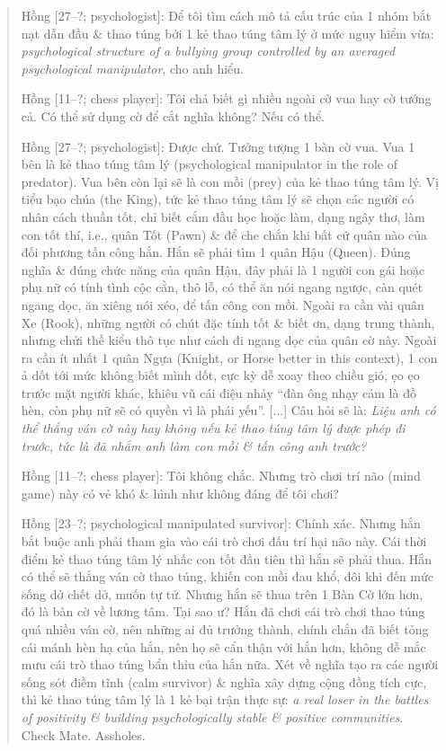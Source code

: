 \documentclass[12pt]{article}
\begin{document}
\begin{quote}
	{\sf Hồng [27--?; psychologist]}: Để tôi tìm cách mô tả cấu trúc của 1 nhóm bắt nạt dẫn đầu \& thao túng bởi 1 kẻ thao túng tâm lý ở mức nguy hiểm vừa: {\it psychological structure of a bullying group controlled by an averaged psychological manipulator}, cho anh hiểu.
	
	{\sf Hồng [11--?; chess player]}: Tôi chả biết gì nhiều ngoài cờ vua hay cờ tướng cả. Có thể sử dụng cờ để cắt nghĩa không? Nếu có thể.
	
	{\sf Hồng [27--?; psychologist]}: Được chứ. Tưởng tượng 1 bàn cờ vua. Vua 1 bên là kẻ thao túng tâm lý (psychological manipulator in the role of predator). Vua bên còn lại sẽ là con mồi (prey) của kẻ thao túng tâm lý. Vị tiểu bạo chúa (the King), tức kẻ thao túng tâm lý sẽ chọn các người có nhân cách thuần tốt, chỉ biết cắm đầu học hoặc làm, dạng ngây thơ, làm con tốt thí, i.e., quân Tốt (Pawn) \& để che chắn khi bất cứ quân nào của đối phương tấn công hắn. Hắn sẽ phải tìm 1 quân Hậu (Queen). Đúng nghĩa \& đúng chức năng của quân Hậu, đây phải là 1 người con gái hoặc phụ nữ có tính tình cộc cằn, thô lỗ, có thể ăn nói ngang ngược, càn quét ngang dọc, ăn xiêng nói xéo, để tấn công con mồi. Ngoài ra cần vài quân Xe (Rook), những người có chút đặc tính tốt \& biết ơn, dạng trung thành, nhưng chửi thề kiểu thô tục như cách đi ngang dọc của quân cờ này. Ngoài ra cần ít nhất 1 quân Ngựa (Knight, or Horse better in this context), 1 con ả dốt tới mức không biết mình dốt, cực kỳ dễ xoay theo chiều gió, ẹo ẹo trước mặt người khác, khiêu vũ cái điệu nhảy ``đàn ông nhạy cảm là đồ hèn, còn phụ nữ sẽ có quyền vì là phái yếu''. [...] Câu hỏi sẽ là: {\it Liệu anh có thể thắng ván cờ này hay không nếu kẻ thao túng tâm lý được phép đi trước, tức là đã nhắm anh làm con mồi \& tấn công anh trước?}
	
	{\sf Hồng [11--?; chess player]}: Tôi không chắc. Nhưng trò chơi trí não (mind game) này có vẻ khó \& hình như không đáng để tôi chơi?
	
	{\sf Hồng [23--?; psychological manipulated survivor]}: Chính xác. Nhưng hắn bắt buộc anh phải tham gia vào cái trò chơi đấu trí hại não này. Cái thời điểm kẻ thao túng tâm lý nhấc con tốt đầu tiên thì hắn sẽ phải thua. Hắn có thể sẽ thắng ván cờ thao túng, khiến con mồi đau khổ, đôi khi đến mức sống dở chết dở, muốn tự tử. Nhưng hắn sẽ thua trên 1 Bàn Cờ lớn hơn, đó là bàn cờ về lương tâm. Tại sao ư? Hắn đã chơi cái trò chơi thao túng quá nhiều ván cờ, nên những ai đủ trưởng thành, chính chắn đã biết tỏng cái mánh hèn hạ của hắn, nên họ sẽ cẩn thận với hắn hơn, không dễ mắc mưu cái trò thao túng bẩn thỉu của hắn nữa. Xét về nghĩa tạo ra các người sống sót điềm tĩnh (calm survivor) \& nghĩa xây dựng cộng đồng tích cực, thì kẻ thao túng tâm lý là 1 kẻ bại trận thực sự: {\it a real loser in the battles of positivity \& building psychologically stable \& positive communities}. Check Mate. Assholes.
\end{quote}
\end{document}
